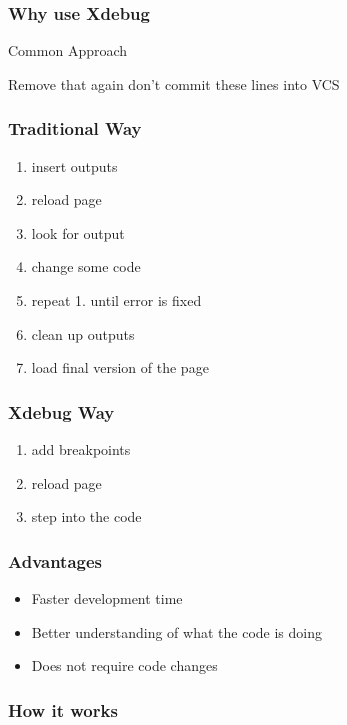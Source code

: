 \begin{frame}\frametitle{Why use Xdebug}
    \begin{exampleblock}{Common Approach}
        
    \end{exampleblock}
    \pause
    \begin{alertblock}{Remove that again}
        don't commit these lines into VCS
    \end{alertblock}
\end{frame}

\begin{frame}\frametitle{Traditional Way}
    \begin{enumerate}
        \item insert outputs 
        \item reload page
        \item look for output 
        \item change some code \pause
        \item repeat 1. until error is fixed \pause
        \item clean up outputs
        \item load final version of the page
    \end{enumerate}
\end{frame}

\begin{frame}\frametitle{Xdebug Way}
    \begin{enumerate}
        \item add breakpoints \pause
        \item reload page \pause
        \item step into the code
    \end{enumerate}
\end{frame}

\begin{frame}\frametitle{Advantages}
    \begin{itemize}
        \item Faster development time
        \item Better understanding of what the code is doing
        \item Does not require code changes
    \end{itemize}
\end{frame}
 
\begin{frame}\frametitle{How it works}
\end{frame}